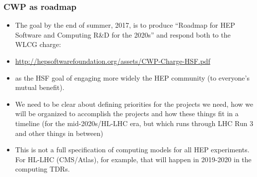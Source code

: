 \begin{frame}
\frametitle{CWP as roadmap}

\begin{itemize}
\item The goal by the end of summer, 2017, is to produce ``Roadmap for HEP Software and 
Computing R\&D for the 2020s'' and respond both to the WLCG charge:
\item \url{http://hepsoftwarefoundation.org/assets/CWP-Charge-HSF.pdf}
\item as the HSF goal of engaging more widely the HEP community (to everyone's mutual benefit).
\item We need to be clear about defining priorities for the projects we need, how we will be organized to accomplish the projects and how these things fit in a timeline (for the mid-2020s/HL-LHC era, but which runs through LHC Run 3 and other things in between)
\item This is not a full specification of computing models for all HEP experiments. For HL-LHC (CMS/Atlas), for example, that will happen in 2019-2020 in the computing TDRs.
\end{itemize}

\end{frame}


